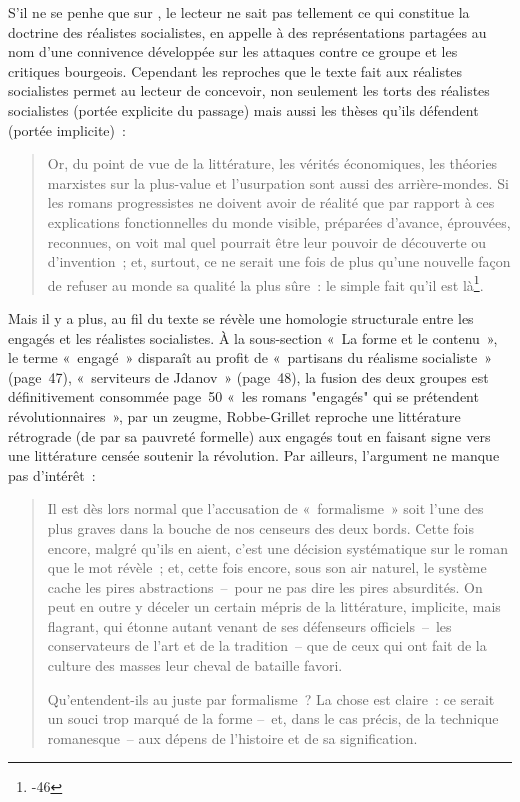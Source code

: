 \documentclass[12pt, a4paper]{article}
\begin{document}
S'il ne se penhe que sur \punr{}, le lecteur ne sait pas tellement ce qui constitue la doctrine des réalistes socialistes, \robbe{} en appelle à des représentations partagées au nom d'une connivence développée sur les attaques contre ce groupe et les critiques bourgeois. Cependant les reproches que le texte fait aux réalistes socialistes permet au lecteur de concevoir, non seulement les torts des réalistes socialistes (portée explicite du passage) mais aussi les thèses qu'ils défendent (portée implicite)~:
\begin{quote}
Or, du point de vue de la littérature, les vérités économiques, les théories marxistes sur la plus-value et l’usurpation sont aussi des arrière-mondes. Si les romans progressistes ne doivent avoir de réalité que par rapport à ces explications fonctionnelles du monde visible, préparées d’avance, éprouvées, reconnues, on voit mal quel pourrait être leur pouvoir de découverte ou d’invention~; et, surtout, ce ne serait une fois de plus qu’une nouvelle façon de refuser au monde sa qualité la plus sûre~: le simple fait qu’il est là\footnote{-46}.
\end{quote}
Mais il y a plus, au fil du texte se révèle une homologie structurale entre les engagés et les réalistes socialistes. À la sous-section %
«~La forme et le contenu~», le terme «~engagé~» disparaît au profit de «~partisans du réalisme socialiste~» (page~47), «~serviteurs de Jdanov~» (page~48), la fusion des deux groupes est définitivement consommée page~50 «~les romans "engagés" qui se prétendent révolutionnaires~», par un zeugme, Robbe-Grillet reproche une littérature rétrograde (de par sa pauvreté formelle) aux engagés tout en faisant signe vers une littérature censée soutenir la révolution. Par ailleurs, l'argument ne manque pas d'intérêt~: 
\begin{quote}
    Il est dès lors normal que l’accusation de «~formalisme~» soit l’une des plus graves dans la bouche de nos censeurs des deux bords. Cette fois encore, malgré qu’ils en aient, c’est une décision systématique sur le roman que le mot révèle~; et, cette fois encore, sous son air naturel, le système cache les pires abstractions~–~pour ne pas dire les pires absurdités. On peut en outre y déceler un certain mépris de la littérature, implicite, mais flagrant, qui étonne autant venant de ses défenseurs officiels~–~les conservateurs de l’art et de la tradition~– que de ceux qui ont fait de la culture des masses leur cheval de bataille favori.

    Qu’entendent-ils au juste par formalisme~? La chose est claire~: ce serait un souci trop marqué de la forme –~et, dans le cas précis, de la technique romanesque~– aux dépens de l’histoire et de sa signification.
\end{quote}
\end{document}
